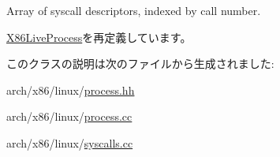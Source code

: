 Array of syscall descriptors, indexed by call number. 

\hyperlink{classX86ISA_1_1X86LiveProcess_a36d3cbdd5c6e5a64542256b84b0fa0c3}{X86LiveProcess}を再定義しています。

このクラスの説明は次のファイルから生成されました:\begin{DoxyCompactItemize}
\item 
arch/x86/linux/\hyperlink{arch_2x86_2linux_2process_8hh}{process.hh}\item 
arch/x86/linux/\hyperlink{arch_2x86_2linux_2process_8cc}{process.cc}\item 
arch/x86/linux/\hyperlink{x86_2linux_2syscalls_8cc}{syscalls.cc}\end{DoxyCompactItemize}
